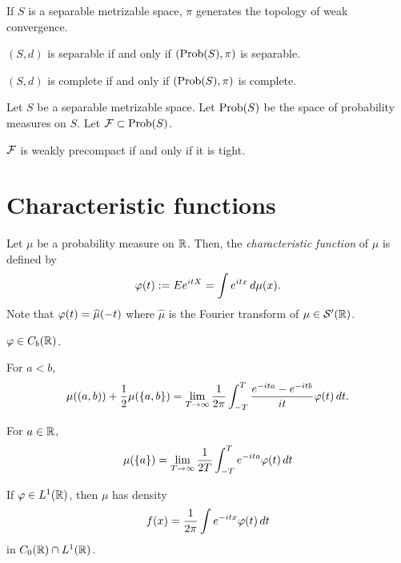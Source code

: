 \documentclass{../note}
\begin{document}
\begin{prb}
\begin{parts}
\item If $S$ is a separable metrizable space, $\pi$ generates the topology of weak convergence.
\item $(S,d)$ is separable if and only if $(\operatorname{Prob}(S),\pi)$ is separable.
\item $(S,d)$ is complete if and only if $(\operatorname{Prob}(S),\pi)$ is complete.
\end{parts}
\end{prb}

\begin{prb}
Let $S$ be a separable metrizable space.
Let $\operatorname{Prob}(S)$ be the space of probability measures on $S$.
Let $\mathcal{F}\subset\operatorname{Prob}(S)$.
\begin{parts}
\item 
\item $\mathcal{F}$ is weakly precompact if and only if it is tight.
\end{parts}
\end{prb}




\section{Characteristic functions}

\begin{prb}
Let $\mu$ be a probability measure on $\mathbb{R}$.
Then, the \emph{characteristic function} of $\mu$ is defined by
\[\varphi(t):=Ee^{itX}=\int e^{itx}\,d\mu(x).\]
Note that $\varphi(t)=\widehat\mu(-t)$ where $\hat\mu$ is the Fourier transform of $\mu\in\mathcal{S}'(\mathbb{R})$.
\begin{parts}
\item $\varphi\in C_b(\mathbb{R})$.
\end{parts}
\end{prb}

\begin{prb}
\begin{parts}
\item For $a<b$,
\[\mu((a,b))+\frac12\mu(\{a,b\})=\lim_{T\to\infty}\frac1{2\pi}\int_{-T}^T\frac{e^{-ita}-e^{-itb}}{it}\varphi(t)\,dt.\]
\item For $a\in\mathbb{R}$,
\[\mu(\{a\})=\lim_{T\to\infty}\frac1{2T}\int_{-T}^Te^{-ita}\varphi(t)\,dt\]
\item If $\varphi\in L^1(\mathbb{R})$, then $\mu$ has density
\[f(x)=\frac1{2\pi}\int e^{-itx}\varphi(t)\,dt\]
in $C_0(\mathbb{R})\cap L^1(\mathbb{R})$.
\end{parts}
\end{prb}
\end{document}
